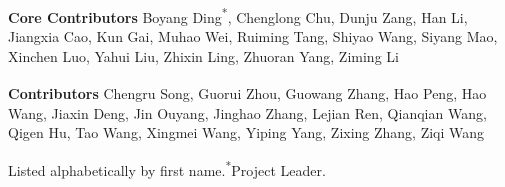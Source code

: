 \documentclass[11pt, a4paper, logo, copyright]{googledeepmind}
\begin{document}


\noindent
\textbf{Core Contributors}\textsuperscript{\dag}\quad
Boyang Ding\textsuperscript{*},
Chenglong Chu,
Dunju Zang,
Han Li,
Jiangxia Cao,
Kun Gai,
Muhao Wei,
Ruiming Tang,
Shiyao Wang,
Siyang Mao,
Xinchen Luo,
Yahui Liu,
Zhixin Ling,
Zhuoran Yang,
Ziming Li

\vspace{0.5em}
\noindent
\textbf{Contributors}\textsuperscript{\dag}\quad
Chengru Song,
Guorui Zhou,
Guowang Zhang,
Hao Peng,
Hao Wang,
Jiaxin Deng,
Jin Ouyang,
Jinghao Zhang,
Lejian Ren,
Qianqian Wang,
Qigen Hu,
Tao Wang,
Xingmei Wang,
Yiping Yang,
Zixing Zhang,
Ziqi Wang

\vspace{0.5em}
\noindent
{\small \textsuperscript{\dag}Listed alphabetically by first name.\quad \textsuperscript{*}Project Leader.}



\end{document}
